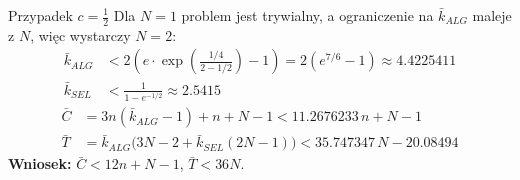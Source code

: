 \begin{frame}{Przypadek $c = \frac{1}{2}$}
  Dla $N = 1$ problem jest trywialny, a ograniczenie na $\bar{k}_{ALG}$ maleje
  z $N$, więc wystarczy $N = 2$:
  \begin{align*}
    \bar{k}_{ALG} &< 2\left(e \cdot \exp\left(\frac{1/4}{2 - 1/2}\right) - 1\right)
                    = 2\left(e^{7/6} - 1\right) \approx 4.4225411 \\
    \bar{k}_{SEL} &< \frac{1}{1 - e^{-1/2}} \approx 2.5415
  \end{align*}
  \pause
  \begin{align*}
    \bar{C} &= 3n(\bar{k}_{ALG} - 1) + n + N - 1 < 11.2676233\,n + N - 1 \\
    \bar{T} &= \bar{k}_{ALG}\bigl(3N - 2 + \bar{k}_{SEL}(2N - 1)\bigr)
             < 35.747347\,N - 20.08494
  \end{align*}
  \pause
  \textbf{Wniosek:} $\bar{C} < 12n + N - 1$, \quad $\bar{T} < 36N$.
\end{frame}

